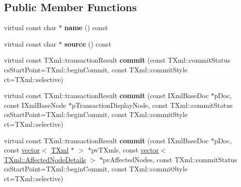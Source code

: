 \subsection*{\-Public \-Member \-Functions}
\begin{DoxyCompactItemize}
\item 
\hypertarget{classgeneral__server_1_1TXmlProcessor_abfedf026d7cb4e1368d505b0b0f6d33e}{virtual const char $\ast$ {\bfseries name} () const }\label{classgeneral__server_1_1TXmlProcessor_abfedf026d7cb4e1368d505b0b0f6d33e}

\item 
\hypertarget{classgeneral__server_1_1TXmlProcessor_ad0044ca5115b79bb732f1e04753cdad4}{virtual const char $\ast$ {\bfseries source} () const }\label{classgeneral__server_1_1TXmlProcessor_ad0044ca5115b79bb732f1e04753cdad4}

\item 
\hypertarget{classgeneral__server_1_1TXmlProcessor_aa371abf6f40eec4ede309c274482efa7}{virtual const \*
\-T\-Xml\-::transaction\-Result {\bfseries commit} (const \-T\-Xml\-::commit\-Status cs\-Start\-Point=\-T\-Xml\-::begin\-Commit, const \-T\-Xml\-::commit\-Style ct=\-T\-Xml\-::selective)}\label{classgeneral__server_1_1TXmlProcessor_aa371abf6f40eec4ede309c274482efa7}

\item 
\hypertarget{classgeneral__server_1_1TXmlProcessor_a4af60c29a65d64fad71daa3d850d9cb3}{virtual const \*
\-T\-Xml\-::transaction\-Result {\bfseries commit} (const \-I\-Xml\-Base\-Doc $\ast$p\-Doc, const \-I\-Xml\-Base\-Node $\ast$p\-Transaction\-Display\-Node, const \-T\-Xml\-::commit\-Status cs\-Start\-Point=\-T\-Xml\-::begin\-Commit, const \-T\-Xml\-::commit\-Style ct=\-T\-Xml\-::selective)}\label{classgeneral__server_1_1TXmlProcessor_a4af60c29a65d64fad71daa3d850d9cb3}

\item 
\hypertarget{classgeneral__server_1_1TXmlProcessor_a3e55d9cbc78c5333047f2be6e6b4d602}{virtual const \*
\-T\-Xml\-::transaction\-Result {\bfseries commit} (const \-I\-Xml\-Base\-Doc $\ast$p\-Doc, const \hyperlink{classvector}{vector}$<$ \hyperlink{classgeneral__server_1_1TXml}{\-T\-Xml} $\ast$ $>$ $\ast$pv\-T\-Xmls, const \hyperlink{classvector}{vector}$<$ \hyperlink{structgeneral__server_1_1TXml_1_1AffectedNodeDetails}{\-T\-Xml\-::\-Affected\-Node\-Details} $>$ $\ast$pv\-Affected\-Nodes, const \-T\-Xml\-::commit\-Status cs\-Start\-Point=\-T\-Xml\-::begin\-Commit, const \-T\-Xml\-::commit\-Style ct=\-T\-Xml\-::selective)}\label{classgeneral__server_1_1TXmlProcessor_a3e55d9cbc78c5333047f2be6e6b4d602}


\end{DoxyCompactItemize}
